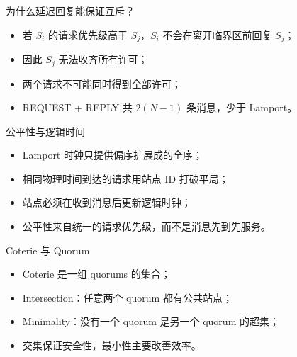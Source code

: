 \documentclass[UTF8,fontset=none,aspectratio=169,10pt]{beamer}
\begin{document}
\begin{frame}{为什么延迟回复能保证互斥？}
\begin{itemize}
  \item 若 $S_i$ 的请求优先级高于 $S_j$，$S_i$ 不会在离开临界区前回复 $S_j$；
  \item 因此 $S_j$ 无法收齐所有许可；
  \item 两个请求不可能同时得到全部许可；
  \item REQUEST + REPLY 共 $2(N-1)$ 条消息，少于 Lamport。
\end{itemize}
\vfill
{}
\end{frame}

\begin{frame}{公平性与逻辑时间}
\begin{itemize}
  \item Lamport 时钟只提供偏序扩展成的全序；
  \item 相同物理时间到达的请求用站点 ID 打破平局；
  \item 站点必须在收到消息后更新逻辑时钟；
  \item 公平性来自统一的请求优先级，而不是消息先到先服务。
\end{itemize}
\end{frame}


\begin{frame}{Coterie 与 Quorum}
\begin{itemize}
  \item Coterie 是一组 quorums 的集合；
  \item Intersection：任意两个 quorum 都有公共站点；
  \item Minimality：没有一个 quorum 是另一个 quorum 的超集；
  \item 交集保证安全性，最小性主要改善效率。
\end{itemize}
\begin{center}
\end{center}
\end{frame}
\end{document}
